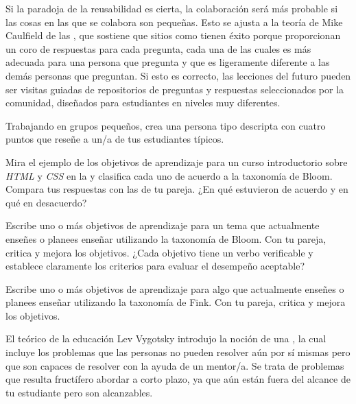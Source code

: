 Si la paradoja de la reusabilidad es cierta,
la colaboración será más probable
si las cosas en las que se colabora son pequeñas.
Esto se ajusta a la teoría de Mike Caulfield  de las
,
que sostiene que sitios como
 tienen éxito porque
proporcionan un coro de respuestas para cada pregunta,
cada una de las cuales es más adecuada para
una persona que pregunta y que es ligeramente diferente a las demás personas que preguntan.
Si esto es correcto,
las lecciones del futuro pueden ser visitas guiadas de repositorios
de preguntas y respuestas seleccionados por la comunidad,
diseñados para estudiantes en niveles muy diferentes.
 
 
 
 
Trabajando en grupos pequeños,
crea una persona tipo descripta con cuatro puntos que reseñe a un/a de tus estudiantes típicos.
 
 
Mira el ejemplo de los objetivos de aprendizaje
para un curso introductorio sobre \emph{HTML} y \emph{CSS}
en la 
y clasifica cada uno de acuerdo a la taxonomía de Bloom.
Compara tus respuestas con las de tu pareja.
¿En qué estuvieron de acuerdo y en qué en desacuerdo?
 
 
Escribe uno o más objetivos de aprendizaje
para un tema que actualmente enseñes o planees enseñar
utilizando la taxonomía de Bloom.
Con tu pareja,
critica y mejora los objetivos.
¿Cada objetivo tiene un verbo verificable y establece claramente
los criterios para evaluar el desempeño aceptable?
 
 
Escribe uno o más objetivos de aprendizaje
para algo que actualmente enseñes o planees enseñar
utilizando la taxonomía de Fink.
Con tu pareja,
critica y mejora los objetivos.
 
 
El teórico de la educación Lev Vygotsky introdujo la noción de una
,
la cual incluye los problemas que las personas no pueden resolver aún por sí mismas
pero que son capaces de resolver con la ayuda de un mentor/a.
Se trata de problemas que resulta fructífero abordar a corto plazo,
ya que aún están fuera del alcance de tu estudiante pero son alcanzables.
 
